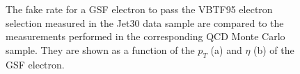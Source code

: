 \documentclass{cmspaper}
\begin{document}
\begin{figure}[htb]
  \begin{center}
    
    \caption{The fake rate for a GSF electron to pass the VBTF95 electron selection measured in the Jet30 data sample are compared to the measurements performed in the corresponding QCD Monte Carlo sample. They are shown as a function of the $p_T$ (a) and $\eta$ (b) of the GSF electron. }
    \label{fig:GSFElectronFakeRate}
  \end{center}
\end{figure}
\end{document}
